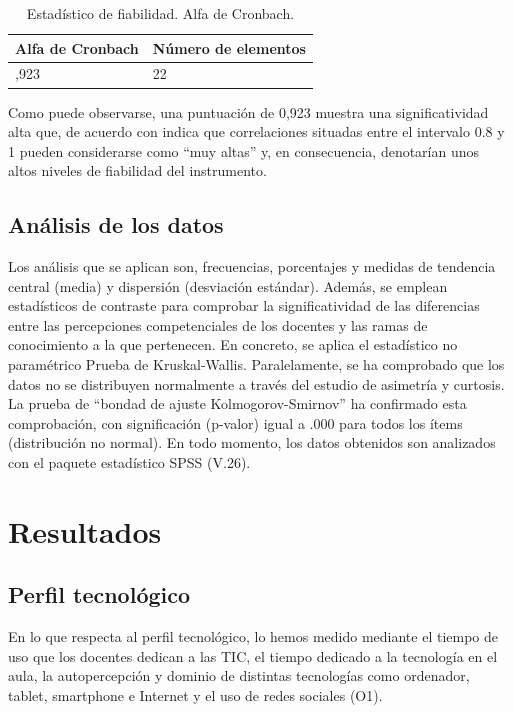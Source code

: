 \documentclass[spanish]{textolivre}
\begin{document}
\begin{table}[htpb]
\caption{Estadístico de fiabilidad. Alfa de Cronbach.}
\label{tab2}
\centering
\begin{tabular}{ll}
\toprule
Alfa de Cronbach & Número de elementos
\\ 
\midrule
,923 & 22
\\ 
\bottomrule
\end{tabular}
\end{table}

Como puede observarse, una puntuación de 0,923 muestra una significatividad alta que, de acuerdo con \textcite[p. 189]{bisquerra1987} indica que correlaciones situadas entre el intervalo 0.8 y 1 pueden considerarse como “muy altas” y, en consecuencia, denotarían unos altos niveles de fiabilidad del instrumento.  

\subsection{Análisis de los datos}
Los análisis que se aplican son, frecuencias, porcentajes y medidas de tendencia central (media) y dispersión (desviación estándar). Además, se emplean estadísticos de contraste para comprobar la significatividad de las diferencias entre las percepciones competenciales de los docentes y las ramas de conocimiento a la que pertenecen. En concreto, se aplica el estadístico no paramétrico Prueba de Kruskal-Wallis. Paralelamente, se ha comprobado que los datos no se distribuyen normalmente a través del estudio de asimetría y curtosis. La prueba de “bondad de ajuste Kolmogorov-Smirnov” ha confirmado esta comprobación, con significación (p-valor) igual a .000 para todos los ítems (distribución no normal). En todo momento, los datos obtenidos son analizados con el paquete estadístico SPSS (V.26).

\section{Resultados}
\subsection{Perfil tecnológico}
En lo que respecta al perfil tecnológico, lo hemos medido mediante el tiempo de uso que los docentes dedican a las TIC, el tiempo dedicado a la tecnología en el aula, la autopercepción y dominio de distintas tecnologías como ordenador, tablet, smartphone e Internet y el uso de redes sociales (O1).
\end{document}
